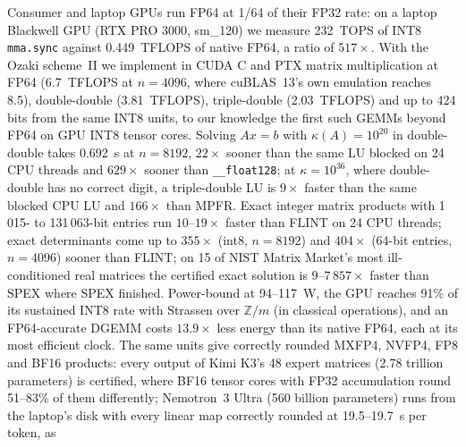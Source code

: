 Consumer and laptop GPUs run FP64 at 1/64 of their FP32 rate: on a laptop Blackwell GPU (RTX PRO 3000, sm\_120) we measure
232~TOPS of INT8 \texttt{mma.sync} against 0.449~TFLOPS of native FP64, a ratio of $517\times$. With the Ozaki scheme~II
we implement in CUDA C and PTX matrix multiplication at FP64 (6.7~TFLOPS at $n=4096$, where cuBLAS~13's own emulation reaches 8.5),
double-double (3.81~TFLOPS), triple-double (2.03~TFLOPS) and up to 424 bits from the same INT8 units, to our knowledge the
first such GEMMs beyond FP64 on GPU INT8 tensor cores. Solving $Ax=b$ with $\kappa(A)=10^{20}$ in double-double takes 0.692~s at
$n=8192$, $22\times$ sooner than the same LU blocked on 24 CPU threads and $629\times$ sooner than \texttt{\_\_float128}; at
$\kappa=10^{36}$, where double-double has no correct digit, a triple-double LU is $9\times$ faster than the same blocked CPU LU
and $166\times$ than MPFR. Exact integer matrix products with 1\,015- to
131\,063-bit entries run $10$--$19\times$ faster than FLINT on 24 CPU threads; exact determinants come up to $355\times$
(int8, $n=8192$) and $404\times$ (64-bit entries, $n=4096$) sooner than FLINT; on 15 of NIST Matrix Market's most ill-conditioned real
matrices the certified exact solution is $9$--$7\,857\times$ faster than SPEX where SPEX finished. Power-bound at
94--117~W, the GPU reaches 91\% of its sustained INT8 rate with Strassen over $\mathbb{Z}/m$ (in classical operations), and
an FP64-accurate DGEMM costs $13.9\times$ less energy than its native FP64, each at its most efficient clock. The same units
give correctly rounded MXFP4, NVFP4, FP8 and BF16 products: every output of Kimi K3's 48 expert matrices (2.78 trillion
parameters) is certified, where BF16 tensor cores with FP32 accumulation round 51--83\% of them differently; Nemotron~3
Ultra (560 billion parameters) runs from the laptop's disk with every linear map correctly rounded at 19.5--19.7~s per token, as
